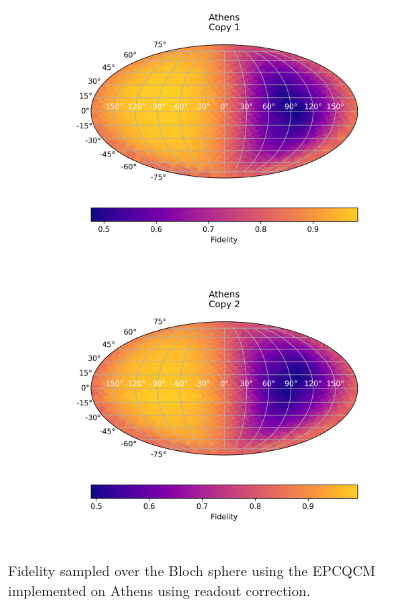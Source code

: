\begin{figure}[H]
  \centering
  \begin{subfigure}{.5\textwidth}
    \centering
    \includegraphics[width=\textwidth]{Figures/Economical/IBM/FullSphere/results_corrected_athens_copy1.png}
    \label{fig:epc_corrected_athens_sphere_1}
  \end{subfigure}%
  \begin{subfigure}{.5\textwidth}
    \centering
    \includegraphics[width=\textwidth]{Figures/Economical/IBM/FullSphere/results_corrected_athens_copy2.png}
    \label{fig:epc_corrected_athens_sphere_2}
  \end{subfigure}
  \caption{Fidelity sampled over the Bloch sphere using the EPCQCM implemented on Athens using readout correction.}
  \label{fig:epc_corrected_athens_sphere}
\end{figure}


